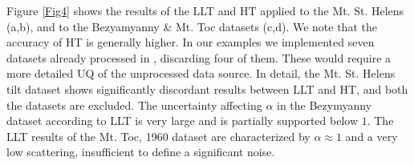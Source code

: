 \documentclass{article}
\begin{document}
Figure \ref{Fig4} shows the results of the LLT and HT applied to the Mt. St. Helens (a,b), and to the Bezyamyanny \& Mt. Toc datasets (c,d). We note that the accuracy of HT is generally higher. In our examples we implemented seven datasets already processed in \cite{Voight1988}, discarding four of them. These would require a more detailed UQ of the unprocessed data source. In detail, the Mt. St. Helens tilt dataset shows significantly discordant results between LLT and HT, and both the datasets are excluded. The uncertainty affecting $\alpha$ in the Bezymyanny dataset according to LLT is very large and is partially supported below $1$. The LLT results of the Mt. Toc, 1960 dataset are characterized by $\alpha\approx 1$ and a very low scattering, insufficient to define a significant noise.



\end{document}
